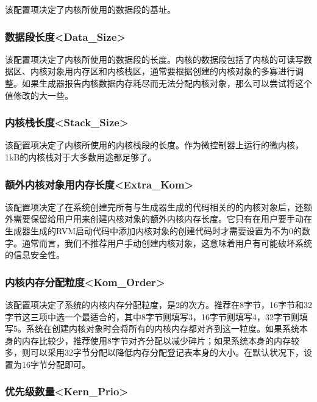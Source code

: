 该配置项决定了内核所使用的数据段的基址。

\subsubsection{数据段长度<Data\_Size>{}}\label{subsubsec:5-3-12-4}

该配置项决定了内核所使用的数据段的长度。内核的数据段包括了内核的可读写数据区、内核对象用内存区和内核栈区，通常要根据创建的内核对象的多寡进行调整。如果生成器报告内核数据内存耗尽而无法分配内核对象，那么可以尝试将这个值修改的大一些。

\subsubsection{内核栈长度<Stack\_Size>{}}\label{subsubsec:5-3-12-5}

该配置项决定了内核所使用的内核栈段的长度。作为微控制器上运行的微内核，1kB的内核栈对于大多数用途都足够了。

\subsubsection{额外内核对象用内存长度<Extra\_Kom>{}}\label{subsubsec:5-3-12-6}

该配置项决定了在系统创建完所有与生成器生成的代码相关的的内核对象后，还额外需要保留给用户用来创建内核对象的额外内核内存长度。它只有在用户要手动在生成器生成的RVM启动代码中添加内核对象的创建代码时才需要设置为不为0的数字。通常而言，我们不推荐用户手动创建内核对象，这意味着用户有可能破坏系统的信息安全性。

\subsubsection{内核内存分配粒度<Kom\_Order>{}}\label{subsubsec:5-3-12-7}

该配置项决定了系统的内核内存分配粒度，是2的次方。推荐在8字节，16字节和32字节这三项中选一个最适合的，其中8字节则填写3，16字节则填写4，32字节则填写5。系统在创建内核对象时会将所有的内核内存都对齐到这一粒度。如果系统本身的内存比较少，推荐使用8字节对齐分配以减少碎片；如果系统本身的内存较多，则可以采用32字节分配以降低内存分配登记表本身的大小。在默认状况下，设置为16字节分配即可。

\subsubsection{优先级数量<Kern\_Prio>{}}\label{subsubsec:5-3-12-8}


